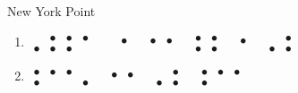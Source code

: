 \begin{refsection}
\begin{problem}{New York Point}{\namePLittell}{}
\begin{multicols}{2}
\begin{enumerate}
\item {\Large \boldmath$\begin{smallmatrix} 
    & \bullet & \bullet & \bullet & \\  \bullet&\bullet & \bullet &
\end{smallmatrix}$\ \ $\begin{smallmatrix}
  \bullet \\  \, 
\end{smallmatrix}$\ \ $\begin{smallmatrix}
  \bullet & \bullet \\  & 
\end{smallmatrix}$\ \ $\begin{smallmatrix}
 \bullet  & \bullet  \\ \bullet& \bullet
\end{smallmatrix}$\ \ $\begin{smallmatrix}
 \bullet  \\ \,
\end{smallmatrix}$\ \ $\begin{smallmatrix}
  & \bullet  \\ \bullet& \bullet
\end{smallmatrix}$}

\item {\Large \boldmath$\begin{smallmatrix} 
    \bullet & \bullet & \bullet &  \\ \bullet & &  &\bullet
\end{smallmatrix}$\ \ $\begin{smallmatrix}
  \bullet & \bullet \\  & 
\end{smallmatrix}$\ \ $\begin{smallmatrix}
  & \bullet \\ \bullet & \bullet
\end{smallmatrix}$\ \ $\begin{smallmatrix}
  \bullet & \bullet & \bullet  \\ \bullet& & 
\end{smallmatrix}$}


\end{enumerate}
\end{multicols}
\end{problem}
\end{refsection}
